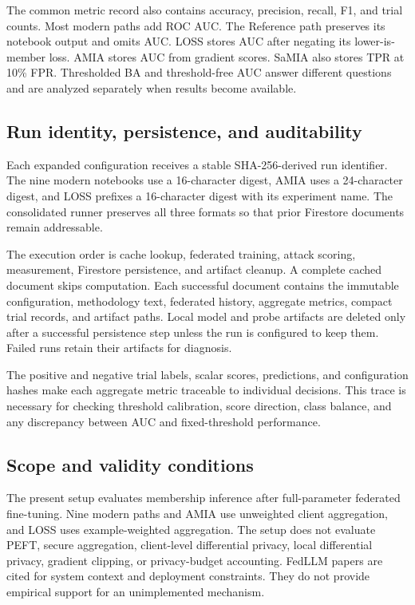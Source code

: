 \documentclass[11pt]{article}
\begin{document}
The common metric record also contains accuracy, precision, recall, F1, and trial counts. Most modern paths add ROC AUC. The Reference path preserves its notebook output and omits AUC. LOSS stores AUC after negating its lower-is-member loss. AMIA stores AUC from gradient scores. SaMIA also stores TPR at 10\% FPR. Thresholded BA and threshold-free AUC answer different questions and are analyzed separately when results become available.

\subsection{Run identity, persistence, and auditability}

Each expanded configuration receives a stable SHA-256-derived run identifier. The nine modern notebooks use a 16-character digest, AMIA uses a 24-character digest, and LOSS prefixes a 16-character digest with its experiment name. The consolidated runner preserves all three formats so that prior Firestore documents remain addressable.

The execution order is cache lookup, federated training, attack scoring, measurement, Firestore persistence, and artifact cleanup. A complete cached document skips computation. Each successful document contains the immutable configuration, methodology text, federated history, aggregate metrics, compact trial records, and artifact paths. Local model and probe artifacts are deleted only after a successful persistence step unless the run is configured to keep them. Failed runs retain their artifacts for diagnosis.

The positive and negative trial labels, scalar scores, predictions, and configuration hashes make each aggregate metric traceable to individual decisions. This trace is necessary for checking threshold calibration, score direction, class balance, and any discrepancy between AUC and fixed-threshold performance.

\subsection{Scope and validity conditions}

The present setup evaluates membership inference after full-parameter federated fine-tuning. Nine modern paths and AMIA use unweighted client aggregation, and LOSS uses example-weighted aggregation. The setup does not evaluate PEFT, secure aggregation, client-level differential privacy, local differential privacy, gradient clipping, or privacy-budget accounting. FedLLM papers are cited for system context and deployment constraints. They do not provide empirical support for an unimplemented mechanism.
\end{document}
